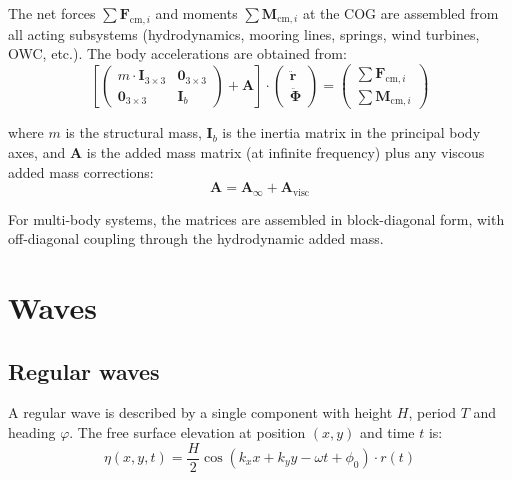 \documentclass[11pt]{article}
\begin{document}
The net forces $\sum\mathbf{F}_{\text{cm},i}$ and moments $\sum\mathbf{M}_{\text{cm},i}$ at the COG are assembled from all acting subsystems (hydrodynamics, mooring lines, springs, wind turbines, OWC, etc.). The body accelerations are obtained from:
\begin{equation}
\left[\begin{pmatrix} m\cdot\mathbf{I}_{3\times 3} & \mathbf{0}_{3\times 3} \\ \mathbf{0}_{3\times 3} & \mathbf{I}_b \end{pmatrix} + \mathbf{A}\right] \cdot \begin{pmatrix} \ddot{\mathbf{r}} \\ \ddot{\boldsymbol{\Phi}} \end{pmatrix} = \begin{pmatrix} \sum\mathbf{F}_{\text{cm},i} \\ \sum\mathbf{M}_{\text{cm},i} \end{pmatrix}
\label{eq:newton}
\end{equation}

where $m$ is the structural mass, $\mathbf{I}_b$ is the inertia matrix in the principal body axes, and $\mathbf{A}$ is the added mass matrix (at infinite frequency) plus any viscous added mass corrections:
\begin{equation}
\mathbf{A} = \mathbf{A}_\infty + \mathbf{A}_{\text{visc}}
\end{equation}

For multi-body systems, the matrices are assembled in block-diagonal form, with off-diagonal coupling through the hydrodynamic added mass.

\section{Waves}
\label{sec:waves}

\subsection{Regular waves}

A regular wave is described by a single component with height $H$, period $T$ and heading $\varphi$. The free surface elevation at position $(x,y)$ and time $t$ is:
\begin{equation}
\eta(x,y,t) = \frac{H}{2}\cos\left(k_x x + k_y y - \omega t + \phi_0\right) \cdot r(t)
\end{equation}
\end{document}
